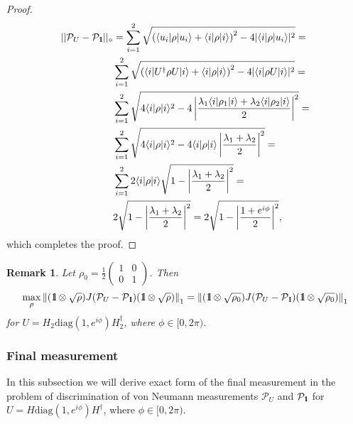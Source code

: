 \documentclass[preprint,12pt, a4paper]{elsarticle}
\newcommand{\ket}[1]{\ensuremath{|#1\rangle}}
\newcommand{\bra}[1]{\ensuremath{\langle#1|}}
\newcommand{\1}{{\rm 1\hspace{-0.9mm}l}}
\newcommand{\Id}{{\rm 1\hspace{-0.9mm}l}}
\newcommand{\PP}{\mathcal{P}}
\newcommand{\diag}{\mathrm{diag}}
\newtheorem{remark}{Remark}
\begin{document}
\begin{proof}
	\begin{equation}
	\begin{split}
	||\mathcal{P}_U - \mathcal{P}_{\1}||_\diamond &= \sum_{i=1}^2  \sqrt{\left(\bra{u_i}\rho\ket{u_i} + \bra{i} \rho \ket{i} \right)^2 - 4|\bra{i}\rho\ket{u_i}|^2} = \\& \sum_{i=1}^2  \sqrt{\left(\bra{i}U^\dagger\rho U \ket{i} + \bra{i} \rho \ket{i} \right)^2 - 4|\bra{i}\rho U \ket{i}|^2} = \\& \sum_{i=1}^2  \sqrt{4 \bra{i}\rho \ket{i}^2 - 4 \left| \frac{\lambda_1 \bra{i}\rho_1 \ket{i} + \lambda_2\bra{i} \rho_2\ket{i}}{2}\right|^2} =\\&  \sum_{i=1}^2  \sqrt{4 \bra{i}\rho \ket{i}^2 - 4 \bra{i} \rho \ket{i} \left| \frac{\lambda_1 + \lambda_2}{2}\right|^2} = \\&  \sum_{i=1}^2 2 \bra{i} \rho \ket{i} \sqrt{1 -\left| \frac{\lambda_1 + \lambda_2}{2}\right|^2 } = \\& 2 \sqrt{1 -\left| \frac{\lambda_1 + \lambda_2}{2}\right|^2 } = 
	2 \sqrt{1 -\left| \frac{1+e^{i \phi}}{2}\right|^2 } ,
	\end{split}
	\end{equation}
which completes the proof.
\end{proof}


\begin{remark}\label{lemma:rho}
	Let $\rho_{0} = \frac{1}{2} 
	\left(\begin{array}{cc}1&0\\0&1\end{array}\right)$. Then 
	\begin{equation}
	 \max_\rho \left\|(\1\otimes \sqrt{\rho}) J(\PP_U - \PP_{\Id}) 
	(\1\otimes 
	\sqrt{\rho})\right\|_1 =    \left\|(\1\otimes \sqrt{\rho_0}) J(\PP_U - 
	\PP_{\Id}) 
		(\1\otimes 
		\sqrt{\rho_0})\right\|_1
	\end{equation}
	for  $U = H_2\diag(1, e^{i \phi}) H_2^\dagger $, 
		where $\phi \in [0, 2\pi)$. 
\end{remark}


\subsubsection{Final measurement}\label{sec_example_final_measurement}
In this subsection we will derive exact form of the final measurement in the
problem of discrimination of von Neumann measurements $\PP_U$ and $\PP_{\Id}$
for $U = H \diag(1, e^{i \phi}) H^\dagger$, where $\phi \in [0, 2\pi)$.
\end{document}
